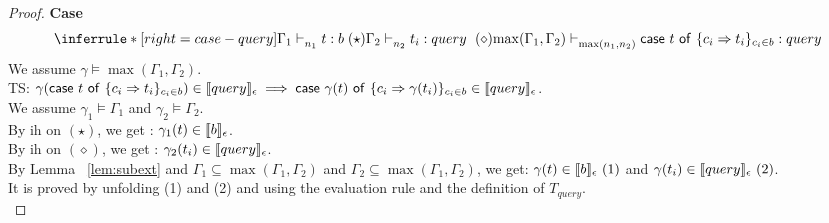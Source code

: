 \documentclass{article}
\begin{document}
\begin{proof}
  \noindent \textbf{Case}
  \[
   \inferrule*[ right = case-query]
   {\Gamma_1 \jtype{n_1}{}{t}{b}(\star) \\ \Gamma_2 \jtype{n_2}{}{t_i}{query}~(\diamond) }
   {\max(\Gamma_1, \Gamma_2) \jtype{\max(n_1,n_2)}{}{\tcaseof{t}\ \{c_i \Rightarrow t_i\}_{c_i \in b} } {query} }
  \]
  We assume $\gamma \vDash \max(\Gamma_1, \Gamma_2) $.\\
  TS: $\gamma(\mathsf{case}~t~\mathsf{of}\ \{c_i \Rightarrow t_i\}_{c_i \in b}) \in \llbracket {query} \rrbracket_{\epsilon} \implies \mathsf{case}~\gamma(t)~\mathsf{of}\ \{c_i \Rightarrow \gamma(t_i)\}_{c_i \in b} \in \llbracket {query} \rrbracket_{\epsilon} $.\\
  We assume $\gamma_1 \vDash \Gamma_1$ and $\gamma_2 \vDash \Gamma_2 $.\\
  By ih on $(\star)$, we get : $ \gamma_1(t) \in \llbracket {b} \rrbracket_{\epsilon}$.\\
  By ih on $(\diamond)$, we get : $ \gamma_2(t_i) \in \llbracket {query} \rrbracket_{\epsilon}$.\\
  By Lemma ~\ref{lem:subext} and $\Gamma_1 \subseteq \max(\Gamma_1,\Gamma_2) $ and $ \Gamma_2 \subseteq \max(\Gamma_1,\Gamma_2) $, we get: $\gamma(t) \in \llbracket {b} \rrbracket_{\epsilon}~(1) $ and $ \gamma(t_i) \in \llbracket {query} \rrbracket_{\epsilon}~(2)$.\\
   It is proved by unfolding (1) and (2) and using the evaluation rule  and the definition of $T_{query}$.\\ 
  

 
 \end{proof}

\clearpage
\end{document}

